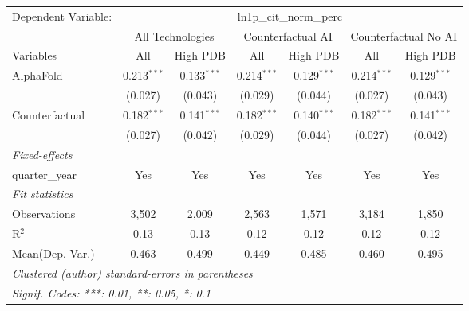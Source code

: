 \begingroup
\centering
\begin{tabular}{lcccccc}
   \tabularnewline \midrule \midrule
   Dependent Variable: & \multicolumn{6}{c}{ln1p\_cit\_norm\_perc}\\
 & \multicolumn{2}{c}{All Technologies} & \multicolumn{2}{c}{Counterfactual AI} & \multicolumn{2}{c}{Counterfactual No AI} \\
\cmidrule(lr){1-1}\cmidrule(lr){2-3} \cmidrule(lr){4-5} \cmidrule(lr){6-7}
Variables & \multicolumn{1}{c}{All} & \multicolumn{1}{c}{High PDB} & \multicolumn{1}{c}{All} & \multicolumn{1}{c}{High PDB} & \multicolumn{1}{c}{All} & \multicolumn{1}{c}{High PDB} \\
\cmidrule(lr){1-1}\cmidrule(lr){2-2} \cmidrule(lr){3-3} \cmidrule(lr){4-4} \cmidrule(lr){5-5} \cmidrule(lr){6-6} \cmidrule(lr){7-7}
   AlphaFold      & 0.213$^{***}$ & 0.133$^{***}$ & 0.214$^{***}$ & 0.129$^{***}$ & 0.214$^{***}$ & 0.129$^{***}$\\   
                  & (0.027)       & (0.043)       & (0.029)       & (0.044)       & (0.027)       & (0.043)\\   
   Counterfactual & 0.182$^{***}$ & 0.141$^{***}$ & 0.182$^{***}$ & 0.140$^{***}$ & 0.182$^{***}$ & 0.141$^{***}$\\   
                  & (0.027)       & (0.042)       & (0.029)       & (0.044)       & (0.027)       & (0.042)\\   
   \midrule
   \emph{Fixed-effects}\\
   quarter\_year  & Yes           & Yes           & Yes           & Yes           & Yes           & Yes\\  
   \midrule
   \emph{Fit statistics}\\
   Observations   & 3,502         & 2,009         & 2,563         & 1,571         & 3,184         & 1,850\\  
   R$^2$          & 0.13          & 0.13          & 0.12          & 0.12          & 0.12          & 0.12\\  
Mean(Dep. Var.) & 0.463 & 0.499 & 0.449 & 0.485 & 0.460 & 0.495 \\
   \midrule \midrule
   \multicolumn{7}{l}{\emph{Clustered (author) standard-errors in parentheses}}\\
   \multicolumn{7}{l}{\emph{Signif. Codes: ***: 0.01, **: 0.05, *: 0.1}}\\
\end{tabular}
\par\endgroup
